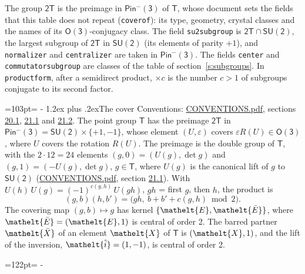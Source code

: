\documentclass[10pt,a4paper]{article}
\makeatletter
\renewcommand\section{\@startsection{section}{1}{\z@}{-3ex plus -1ex minus -.2ex}%
  {1.2ex plus .2ex}{\normalfont\large\sffamily\bfseries\color{parttitle}}}
\newcommand{\needspace}[1]{\par\penalty-100\begingroup\dimen0=#1\relax\dimen2=\pagegoal
  \advance\dimen2-\pagetotal\ifdim\dimen0>\dimen2\relax\ifdim\dimen2>0pt\vfil\break\fi\fi
  \endgroup}
\numberwithin{equation}{section}
\newcommand{\eltfont}[1]{{\let\sigma\eltsigma\mathelt{#1}}}
\newcommand{\grp}[1]{\mathsf{#1}}
\newcommand{\elt}[1]{\eltfont{#1}}
\newcommand{\dirprod}{\times}
\newcommand{\barred}[1]{\bar{#1}}
\newcommand{\lift}[1]{\tilde{#1}}
\makeatother
\begin{document}
\leavevmode\label{n:element.inversion}\label{n:group.preimage}The group $\grp{2T}$ is the preimage in $\grp{Pin^{-}(3)}$ of \href{../../../rotation/data/pdf/T.pdf}{$\grp{T}$}, whose document sets the fields that this table does not repeat (\texttt{coverof}): its type, geometry, crystal classes and the names of its \href{../../../rotation/data/pdf/O3.pdf}{$\grp{O(3)}$}-conjugacy class. The field \texttt{su2subgroup} is $\grp{2T} \cap \grp{SU(2)}$, the largest subgroup of $\grp{2T}$ in $\grp{SU(2)}$ (its elements of parity $+1$), and \texttt{normalizer} and \texttt{centralizer} are taken in $\grp{Pin^{-}(3)}$. The fields \texttt{center} and \texttt{commutatorsubgroup} are classes of the table of section~\ref{s:subgroups}.
\leavevmode\label{n:index.conjugates.c}In \texttt{productform}, after a semidirect product, ${\times}c$ is the number $c > 1$ of subgroups conjugate to its second factor.
\needspace{103pt}
\section{The cover}\label{s:cover}
Conventions: \href{../../CONVENTIONS.pdf}{CONVENTIONS.pdf}, sections \href{../../CONVENTIONS.pdf\#conv.20.1}{20.1}, \href{../../CONVENTIONS.pdf\#conv.21.1}{21.1} and \href{../../CONVENTIONS.pdf\#conv.21.2}{21.2}.
\leavevmode\label{n:group.pin.minus}\label{n:group.su2}\label{n:local.pin.sign}\label{n:matrix.covered}\label{n:matrix.lift.su2}\label{n:index.bar}The point group $\grp{T}$ has the preimage $\grp{2T}$ in $\grp{Pin^{-}(3)} = \grp{SU(2)} \dirprod \{+1, -1\}$, whose element $(U, \varepsilon)$ covers $\varepsilon R(U) \in \grp{O(3)}$, where $U$ covers the rotation $R(U)$. The preimage is the double group of $\grp{T}$, with the $2 \cdot 12 = 24$ elements $(g, 0) = (U(g), \det g)$ and $(g, 1) = (-U(g), \det g)$, $g \in \grp{T}$, where $U(g)$ is the canonical lift of $g$ to $\grp{SU(2)}$ (\href{../../CONVENTIONS.pdf}{CONVENTIONS.pdf}, section \href{../../CONVENTIONS.pdf\#conv.21.1}{21.1}). \label{n:function.cocycle}With $U(h)\,U(g) = (-1)^{c(g,h)}\,U(gh)$, $gh$ = first $g$, then $h$, the product is
\begin{equation}\label{e:product}(g, b)(h, b') = \bigl(gh,\ b + b' + c(g, h) \bmod 2\bigr).\end{equation}
\leavevmode\label{n:mark.bar}The covering map $(g, b) \mapsto g$ has kernel $\{\elt{E}, \elt{\barred{E}}\}$, where $\elt{\barred{E}} = (\elt{E}, 1)$ is central of order 2. \label{n:element.named}\label{n:mark.lift}The barred partner $\elt{\barred{X}}$ of an element $\elt{X}$ of $\grp{T}$ is $(\elt{X}, 1)$, and the lift of the inversion, $\elt{\lift{i}} = (1, -1)$, is central of order 2.
\needspace{122pt}
\end{document}
